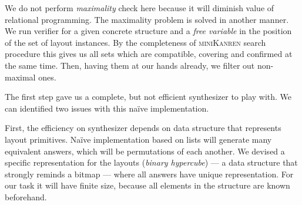 We do not perform \emph{maximality} check here because it will diminish value of relational programming.
%
The maximality problem is solved in another manner.
We run verifier for a given concrete structure and a \emph{free variable} in
the position of the set of layout instances.
By the completeness of \textsc{miniKanren} search procedure this gives us all sets which are compatible, covering and confirmed at
the same time.
Then, having them at our hands already, we filter out non-maximal ones.

The first step gave us a complete, but not efficient synthesizer to play with.
We can identified two issues with this na\"ive implementation.

First, the efficiency on synthesizer depends on data structure that represents layout primitives.
Na\"ive implementation based on lists will generate many equivalent answers, which will be permutations of each another.
We devised a specific representation for the layouts (\emph{binary hypercube}) --- a data structure that strongly reminds a bitmap --- where all answers have unique representation.
For our task it will have finite size, because all elements in the structure are known beforehand.

